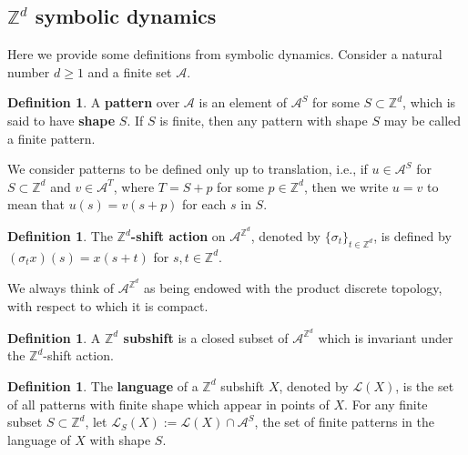 \documentclass[12pt]{amsart}
\theoremstyle{definition}
\newtheorem{definition}[theorem]{Definition}
\begin{document}
\subsection{$\mathbb{Z}^d$ symbolic dynamics}

Here we provide some definitions from symbolic dynamics. Consider a natural number $d \geq 1$ and a finite set $\mathcal{A}$. 

\begin{definition}
A \textbf{pattern} over $\mathcal{A}$ is an element of $\mathcal{A}^S$ for some $S \subset \mathbb{Z}^d$, which is said to have \textbf{shape} $S$. If $S$ is finite, then any pattern with shape $S$ may be called a finite pattern.
\end{definition}

We consider patterns to be defined only up to translation, i.e., if $u \in \mathcal{A}^S$ for $S \subset \mathbb{Z}^d$ and $v \in \mathcal{A}^T$, where $T = S+p$ for some $p \in \mathbb{Z}^d$, then we write $u = v$ to mean that $u(s) = v(s+p)$ for each $s$ in $S$.


\begin{definition}
The \textbf{$\mathbb{Z}^d$-shift action} on $\mathcal{A}^{\mathbb{Z}^d}$, denoted by $\{\sigma_t\}_{t \in \mathbb{Z}^d}$, is defined by $(\sigma_t x)(s) = x(s+t)$ for $s,t \in \mathbb{Z}^d$. 
\end{definition}

We always think of $\mathcal{A}^{\mathbb{Z}^d}$ as being endowed with the product discrete topology, with respect to which it is compact. 

\begin{definition}
A \textbf{$\mathbb{Z}^d$ subshift} is a closed subset of $\mathcal{A}^{\mathbb{Z}^d}$ which is invariant under the $\mathbb{Z}^d$-shift action.
\end{definition}

\begin{definition} 
The \textbf{language} of a $\mathbb{Z}^d$ subshift $X$, denoted by $\mathcal{L}(X)$, is the set of all patterns with finite shape which appear in points of $X$. For any finite subset $S \subset \mathbb{Z}^d$, let $\mathcal{L}_S(X) := \mathcal{L}(X) \cap \mathcal{A}^S$, the set of finite patterns in the language of $X$ with shape $S$.
\end{definition}
\end{document}
